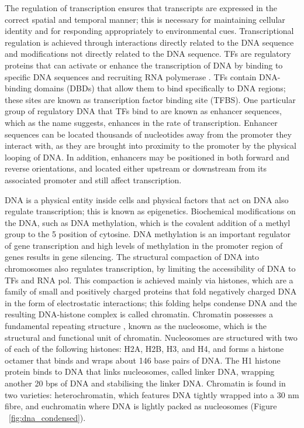 The regulation of transcription ensures that transcripts are expressed in the correct spatial and temporal manner; this is necessary for maintaining cellular identity and for responding appropriately to environmental cues. Transcriptional regulation is achieved through interactions directly related to the DNA sequence and modifications not directly related to the DNA sequence. TFs are regulatory proteins that can activate or enhance the transcription of DNA by binding to specific DNA sequences and recruiting RNA polymerase \citep{pmid11092823}. TFs contain DNA-binding domains (DBDs) that allow them to bind specifically to DNA regions; these sites are known as transcription factor binding site (TFBS). One particular group of regulatory DNA that TFs bind to are known as enhancer sequences, which as the name suggests, enhances in the rate of transcription. Enhancer sequences can be located thousands of nucleotides away from the promoter they interact with, as they are brought into proximity to the promoter by the physical looping of DNA. In addition, enhancers may be positioned in both forward and reverse orientations, and located either upstream or downstream from its associated promoter and still affect transcription.

DNA is a physical entity inside cells and physical factors that act on DNA also regulate transcription; this is known as epigenetics. Biochemical modifications on the DNA, such as DNA methylation, which is the covalent addition of a methyl group to the 5 position of cytosine. DNA methylation is an important regulator of gene transcription and high levels of methylation in the promoter region of genes results in gene silencing. The structural compaction of DNA into chromosomes also regulates transcription, by limiting the accessibility of DNA to TFs and RNA pol. This compaction is achieved mainly via histones, which are a family of small and positively charged proteins that fold negatively charged DNA in the form of electrostatic interactions; this folding helps condense DNA and the resulting DNA-histone complex is called chromatin. Chromatin possesses a fundamental repeating structure \citep{holde01111974}, known as the nucleosome, which is the structural and functional unit of chromatin. Nucleosomes are structured with two of each of the following histones: H2A, H2B, H3, and H4, and forms a histone octamer that binds and wraps about 146 base pairs of DNA. The H1 histone protein binds to DNA that links nucleosomes, called linker DNA, wrapping another 20 bps of DNA and stabilising the linker DNA. Chromatin is found in two varieties: heterochromatin, which features DNA tightly wrapped into a 30 nm fibre, and euchromatin where DNA is lightly packed as nucleosomes (Figure ~\ref{fig:dna_condensed}).

